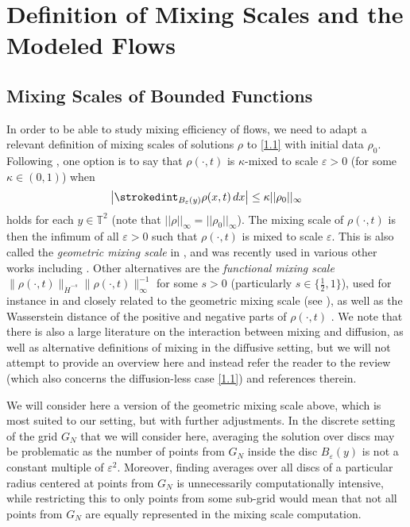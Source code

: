 \documentclass[12pt]{article}
\numberwithin{figure}{section}
\numberwithin{equation}{section}
\newcommand{\beq}{\begin{equation}}
\newcommand{\eeq}{\end{equation}}
\newcommand{\lb}{\label}
\newcommand{\eps}{\varepsilon}
\newcommand{\bbT}{{\mathbb{T}}}
\begin{document}
\section{Definition of Mixing Scales and the Modeled Flows} \lb{S2}

\subsection{Mixing Scales of Bounded Functions}

In order to be able to study mixing efficiency of flows, we need to adapt a relevant definition of mixing scales of solutions $\rho$ to \eqref{1.1} with initial data $\rho_0$.  Following \cite{Bressan,YaoZla}, one option is to say that $\rho(\cdot, t)$ is $\kappa$-mixed to scale $\eps>0$  (for some $\kappa\in(0,1)$) when
\beq \lb{2.1}
\left| \strokedint_{B_{\varepsilon}(y)} \rho(x,t)\,dx \right| \leq \kappa ||\rho_0||_{\infty}
\eeq
holds for each $y\in\bbT^2$ (note that $||\rho||_{\infty}=||\rho_0||_{\infty}$).  The  mixing scale of $\rho(\cdot,t)$ is then the infimum of all $\eps> 0$ such that $\rho(\cdot,t)$ is mixed to scale $\eps$.  This is also called the {\it geometric mixing scale} in \cite{YaoZla}, and was recently used in various other works including \cite{ACM, ACM2,CL, ElgZla, CLS}.  Other alternatives are the {\it functional mixing scale} $\|\rho(\cdot,t)\|_{\dot H^{-s}}\|\rho(\cdot,t)\|_{\infty}^{-1}$ for some $s>0$ (particularly $s\in\{\frac 12,1\}$), used for instance in  \cite{ACM2, BBP, IKX, LTD, LLNMD, S,CLS, ElgZla} and closely related to the geometric mixing scale (see \cite{YaoZla}), as well as the Wasserstein distance of the positive and negative parts of $\rho(\cdot,t)$ \cite{BOS, OSS, S, S2}.
We note that there is also a large literature on the interaction between mixing and diffusion, as well as alternative definitions of mixing in the diffusive setting, but we will not attempt to provide an overview here and instead refer the reader to the review \cite{T} (which also concerns the diffusion-less case \eqref{1.1}) and references therein.

We will consider here a version of the geometric mixing scale above, which is most suited to our setting, but with further adjustments.  In the discrete setting of the grid $G_N$ that we will consider here, averaging the solution over discs may be problematic as the number of points from $G_N$ inside the disc $B_\eps(y)$ is not a constant multiple of $\eps^2$.  Moreover, finding averages over all discs of a particular radius centered at points from $G_N$ is unnecessarily computationally intensive, while restricting this to only points from some sub-grid would mean that not all points from $G_N$ are equally represented in the mixing scale computation.  
\end{document}
